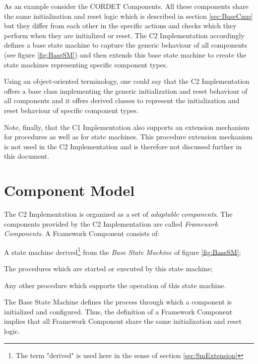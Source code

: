 \documentclass[a4paper,10pt]{article}
\let\stdsection\section
\renewcommand\section{\newpage\stdsection}
\newenvironment{fw_itemize}						%
{\begin{itemize}
  \setlength{\itemsep}{1mm}
  \setlength{\parskip}{0pt}
  \setlength{\parsep}{0pt}}
{\end{itemize}}
\begin{document}
As an example consider the CORDET Components. All these components share the same initialization and reset logic which is described in section \ref{sec:BaseCmp} but they differ from each other in the specific actions and checks which they perform when they are initialized or reset. The C2 Implementation accordingly defines a base state machine to capture the generic behaviour of all components (see figure \ref{fig:BaseSM}) and then extends this base state machine to create the state machines representing specific component types. 

Using an object-oriented terminology, one could say that the C2 Implementation offers a base class implementing the generic initialization and reset behaviour of all components and it offers derived classes to represent the initialization and reset behaviour of specific component types.

Note, finally, that the C1 Implementation also supports an extension mechanism for procedures as well as for state machines. This procedure extension mechanism is not used in the C2 Implementation and is therefore not discussed further in this document. 

\section{Component Model}\label{sec:CmpModel}\label{sec:BaseCmp}
The C2 Implementation is organized as a set of \textit{adaptable components}. The components provided by the C2 Implementation are called \textit{Framework Components}. A Framework Component consists of:

\begin{fw_itemize}
\item A state machine derived\footnote{The term "derived" is used here in the sense of section \ref{sec:SmExtension}} from the \textit{Base State Machine} of figure \ref{fig:BaseSM};
\item The procedures which are started or executed by this state machine;
\item Any other procedure which supports the operation of this state machine.
\end{fw_itemize}

The Base State Machine defines the process through which a component is initialized and configured. Thus, the definition of a Framework Component implies that all Framework Component share the same initialization and reset logic. 
\end{document}
